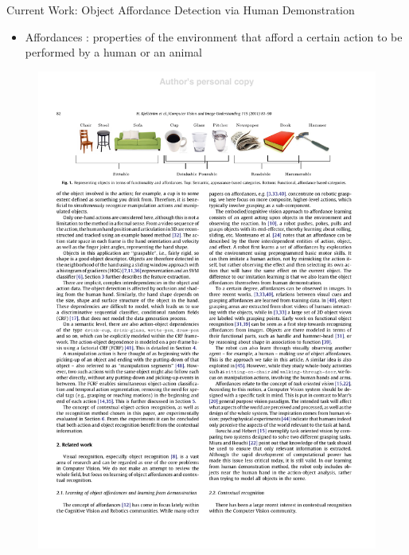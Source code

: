 \documentclass{beamer}
\begin{document}
\begin{frame}{Current Work: Object Affordance Detection via Human Demonstration}
\begin{itemize}
\item Affordances :  properties of the environment that afford a certain action to be performed by a human or an animal
\end{itemize}
\begin{figure}[t!]
\includegraphics[width=.95\linewidth]{affordances.pdf}
\end{figure}
\end{frame}
\end{document}
